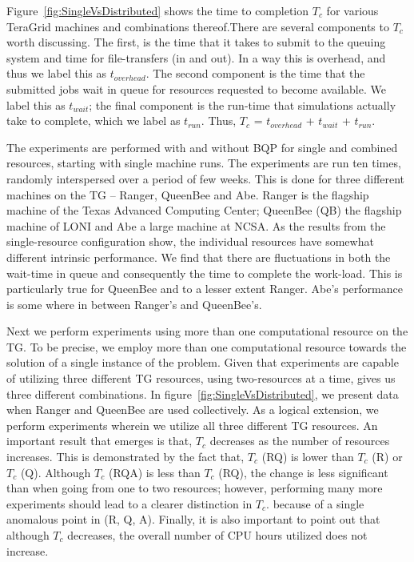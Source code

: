 \documentclass{acm_proc_article-sp}
\newcommand{\tc}{$T_c$ }
\newcommand{\tcnsp}{$T_c$}
\begin{document}
Figure~\ref{fig:SingleVsDistributed} shows the time to completion \tc
for various TeraGrid machines and combinations thereof.There are
several components to \tc worth discussing. The first, is the time
that it takes to submit to the queuing system and time for
file-transfers (in and out). In a way this is overhead, and thus we
label this as $t_{overhead}$.  The second component is the time that
the submitted jobs wait in queue for resources requested to become
available. We label this as $t_{wait}$; the final component is the
run-time that simulations actually take to complete, which we label as
$t_{run}$. Thus, \tc = $t_{overhead}$ + $t_{wait}$ + $t_{run}$.

The experiments are performed with and without BQP for single and
combined resources, starting with single machine runs. The experiments
are run ten times, randomly interspersed over a period of few
weeks. This is done for three different machines on the TG -- Ranger,
QueenBee and Abe.  Ranger is the flagship machine of the Texas
Advanced Computing Center; QueenBee (QB) the flagship machine of LONI
and Abe a large machine at NCSA.  As the results from the
single-resource configuration show, the individual resources have
somewhat different intrinsic performance. We find that there are
fluctuations in both the wait-time in queue and consequently the time
to complete the work-load. This is particularly true for QueenBee and
to a lesser extent Ranger. Abe's performance is some where in between
Ranger's and QueenBee's.

Next we perform experiments using more than one computational resource
on the TG. To be precise, we employ more than one computational
resource towards the solution of a single instance of the problem.
Given that experiments are capable of utilizing three different TG
resources, using two-resources at a time, gives us three different
combinations. In figure~\ref{fig:SingleVsDistributed}, we present data
when Ranger and QueenBee are used collectively.  As a logical
extension, we perform experiments wherein we utilize all three
different TG resources. An important result that emerges is that, \tc
decreases as the number of resources increases. This is demonstrated
by the fact that, \tc (RQ) is lower than \tc (R) or \tc (Q).  Although
\tc (RQA) is less than \tc (RQ), the change is less significant than
when going from one to two resources; however, performing many more
experiments should lead to a clearer distinction in \tcnsp. because of
a single anomalous point in (R, Q, A).  Finally, it is also important
to point out that although \tc decreases, the overall number of CPU
hours utilized does not increase.
\end{document}
